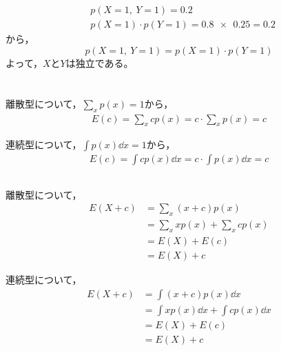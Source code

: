 \documentclass[dvipdfmx, fleqn, titlepage]{jsarticle}
\begin{document}
\subsection{}
\begin{align*}
	& p(X=1,\ Y=1) = 0.2 \\
	& p(X=1) \cdot p(Y=1) = \num{0.8 x 0.25} = 0.2
\end{align*}
から，
\begin{equation*}
	p(X=1,\ Y=1) = p(X=1) \cdot p(Y=1)
\end{equation*}
よって，$X$と$Y$は独立である。



\newpage
\section{}
\subsection{}

離散型について，$\sum_{x} p(x) = 1$から，
\begin{align*}
	E(c) = \sum_{x} cp(x) = c \cdot \sum_x p(x) = c
\end{align*}

連続型について，$\int p(x) \dd x = 1$から，
\begin{align*}
	E(c) = \int c p(x) \dd x = c \cdot \int p(x) \dd x = c
\end{align*}


\subsection{}

離散型について，
\begin{align*}
	E(X+c)
	& = \sum_{x} (x + c) p(x) \\
	& = \sum_{x} x p(x) + \sum_{x} c p(x) \\
	& = E(X) + E(c) \\
	& = E(X) + c
\end{align*}

連続型について，
\begin{align*}
	E(X+c)
	& = \int (x + c) p(x) \dd x \\
	& = \int x p(x) \dd x + \int c p(x) \dd x \\
	& = E(X) + E(c) \\
	& = E(X) + c
\end{align*}


\subsection{}
\end{document}
